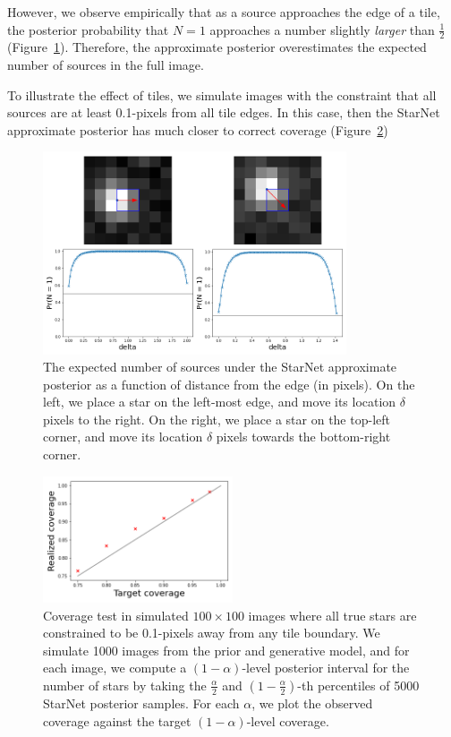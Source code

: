 However, we observe empirically that as a source approaches the edge of a tile,
the posterior probability that $N = 1$ approaches a number
slightly \textit{larger} than $\frac{1}{2}$ (Figure~\ref{fig:starnet_edges}).
Therefore, the approximate posterior overestimates the expected number of sources in the full image.

To illustrate the effect of tiles, we simulate images with the constraint that all sources are at least 0.1-pixels from all tile edges. 
In this case, then the StarNet approximate posterior has much closer to correct coverage (Figure~\ref{fig:coverage_good})

\begin{figure}[tb]
    \centering
    \includegraphics[width=0.8\textwidth]{./figures/coverage/edges_example.png}
    \vspace{-0.4cm}
    \caption{The expected number of sources under the StarNet approximate posterior as a function of distance from the edge (in pixels).
    On the left, we place a star on the left-most edge, and move its location $\delta$ pixels to the right.
    On the right, we place a star on the top-left corner, and move its location $\delta$ pixels towards the bottom-right corner.}
    \label{fig:starnet_edges}
\end{figure}

\begin{figure}[tb]
    \centering
    \includegraphics[width=0.5\textwidth]{./figures/coverage/good_coverage.png}
    \vspace{-0.4cm}
    \caption{Coverage test in simulated $100\times100$ images where all true stars are constrained to be 0.1-pixels away from any tile
    boundary.
    We simulate 1000 images from the prior and generative model, and for each image, we compute a $(1 - \alpha)$-level posterior interval for the number of stars by taking the $\frac{\alpha}{2}$ and $(1 -\frac{\alpha}{2})$-th percentiles of 5000 StarNet posterior samples.
    For each $\alpha$, we plot the observed coverage against the target $(1 - \alpha)$-level coverage. }
    \label{fig:coverage_good}
\end{figure}
